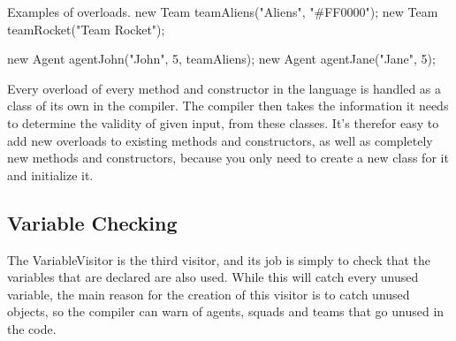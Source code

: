 \begin{source}{Examples of overloads.}{}
	new Team teamAliens("Aliens", "#FF0000");
	new Team teamRocket("Team Rocket");
	
	new Agent agentJohn("John", 5, teamAliens);
	new Agent agentJane("Jane", 5);
\end{source}

Every overload of every method and constructor in the language is handled as a class of its own in the compiler. 
The compiler then takes the information it needs to determine the validity of given input, from these classes. 
It's therefor easy to add new overloads to existing methods and constructors, as well as completely new methods and constructors, because you only need to create a new class for it and initialize it.

\subsection{Variable Checking}
\label{variabelcheck}
The VariableVisitor is the third visitor, and its job is simply to check that the variables that are declared are also used. 
While this will catch every unused variable, the main reason for the creation of this visitor is to catch unused objects, so the compiler can warn of agents, squads and teams that go unused in the code.